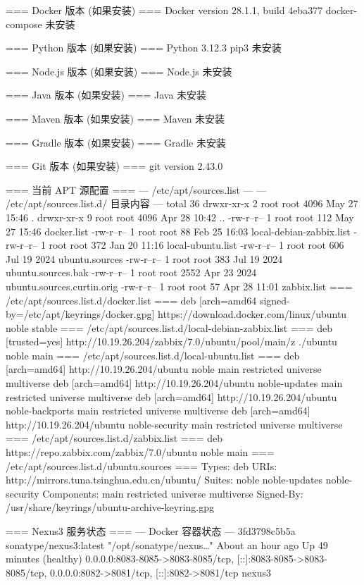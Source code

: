 === Docker 版本 (如果安装) ===
Docker version 28.1.1, build 4eba377
docker-compose 未安装

=== Python 版本 (如果安装) ===
Python 3.12.3
pip3 未安装

=== Node.js 版本 (如果安装) ===
Node.js 未安装

=== Java 版本 (如果安装) ===
Java 未安装

=== Maven 版本 (如果安装) ===
Maven 未安装

=== Gradle 版本 (如果安装) ===
Gradle 未安装

=== Git 版本 (如果安装) ===
git version 2.43.0

=== 当前 APT 源配置 ===
--- /etc/apt/sources.list ---
--- /etc/apt/sources.list.d/ 目录内容 ---
total 36
drwxr-xr-x 2 root root 4096 May 27 15:46 .
drwxr-xr-x 9 root root 4096 Apr 28 10:42 ..
-rw-r--r-- 1 root root  112 May 27 15:46 docker.list
-rw-r--r-- 1 root root   88 Feb 25 16:03 local-debian-zabbix.list
-rw-r--r-- 1 root root  372 Jan 20 11:16 local-ubuntu.list
-rw-r--r-- 1 root root  606 Jul 19  2024 ubuntu.sources
-rw-r--r-- 1 root root  383 Jul 19  2024 ubuntu.sources.bak
-rw-r--r-- 1 root root 2552 Apr 23  2024 ubuntu.sources.curtin.orig
-rw-r--r-- 1 root root   57 Apr 28 11:01 zabbix.list
=== /etc/apt/sources.list.d/docker.list ===
deb [arch=amd64 signed-by=/etc/apt/keyrings/docker.gpg] https://download.docker.com/linux/ubuntu   noble stable
=== /etc/apt/sources.list.d/local-debian-zabbix.list ===
deb [trusted=yes] http://10.19.26.204/zabbix/7.0/ubuntu/pool/main/z ./ubuntu noble main
=== /etc/apt/sources.list.d/local-ubuntu.list ===
deb [arch=amd64] http://10.19.26.204/ubuntu noble main restricted universe multiverse
deb [arch=amd64] http://10.19.26.204/ubuntu noble-updates main restricted universe multiverse
deb [arch=amd64] http://10.19.26.204/ubuntu noble-backports main restricted universe multiverse
deb [arch=amd64] http://10.19.26.204/ubuntu noble-security main restricted universe multiverse
=== /etc/apt/sources.list.d/zabbix.list ===
deb https://repo.zabbix.com/zabbix/7.0/ubuntu noble main
=== /etc/apt/sources.list.d/ubuntu.sources ===
Types: deb
URIs: http://mirrors.tuna.tsinghua.edu.cn/ubuntu/
Suites: noble noble-updates noble-security
Components: main restricted universe multiverse
Signed-By: /usr/share/keyrings/ubuntu-archive-keyring.gpg

=== Nexus3 服务状态 ===
--- Docker 容器状态 ---
3fd3798c5b5a   sonatype/nexus3:latest   "/opt/sonatype/nexus…"   About an hour ago   Up 49 minutes (healthy)   0.0.0.0:8083-8085->8083-8085/tcp, [::]:8083-8085->8083-8085/tcp, 0.0.0.0:8082->8081/tcp, [::]:8082->8081/tcp   nexus3

